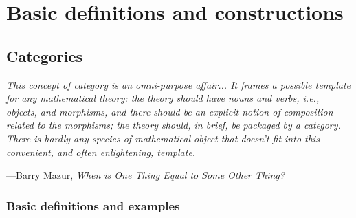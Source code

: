 \documentclass[10pt,oneside]{book}
\theoremstyle{plain}
\theoremstyle{definition}
\theoremstyle{remark}
\numberwithin{equation}{section}
\numberwithin{figure}{section}
\begin{document}
\part{Basic definitions and constructions}
\chapter{Categories}

\epigraph{\itshape This concept of category is an omni-purpose affair... It frames a possible template for any mathematical theory: the theory should have nouns and verbs, i.e., objects, and morphisms, and there should be an explicit notion of composition related to the morphisms; the theory should,
in brief, be packaged by a category. There is hardly any species of mathematical object that doesn't fit into this convenient, and often enlightening, template.}{---Barry Mazur, \emph{When is One Thing Equal to Some Other Thing?} \cite{mazur2007}}

\section{Basic definitions and examples}
\end{document}
